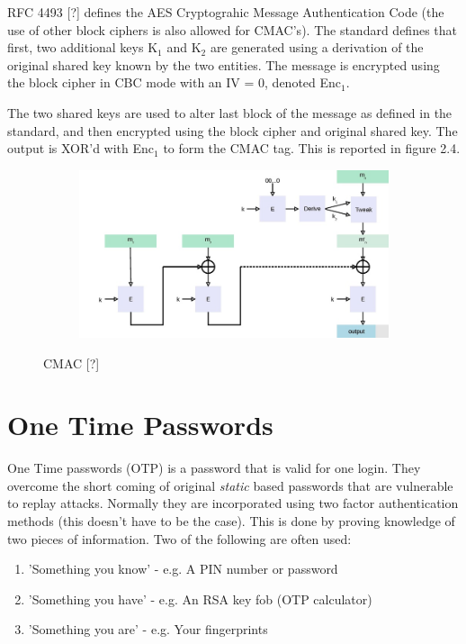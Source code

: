 \documentclass[bsc,frontabs,twoside,singlespacing,parskip,deptreport]{infthesis}     %
\begin{document}
RFC 4493 [?] defines the AES Cryptograhic Message Authentication Code (the use of other block ciphers is also allowed for CMAC's). The standard defines that first, two additional keys K$_1$ and K$_2$ are generated using a derivation of the original shared key known by the two entities. The message is encrypted using the block cipher in CBC mode with an IV = 0, denoted Enc$_1$. 

The two shared keys are used to alter last block of the message as defined in the standard, and then encrypted using the block cipher and original shared key. The output is XOR'd with Enc$_1$ to form the CMAC tag. This is reported in figure 2.4.


\begin{figure}[H]
\centering
\begin{subfigure}{1.2\textwidth}
  \includegraphics[width=1\linewidth]
  {images/crypto/CMAC.jpg}
\end{subfigure}
\caption{CMAC [?]}
\end{figure}


\section{One Time Passwords}
One Time passwords (OTP) is a password that is valid for one login. They overcome the short coming of original \textit{static} based passwords that are vulnerable to replay attacks. Normally they are incorporated using two factor authentication methods (this doesn't have to be the case). This is done by proving knowledge of two pieces of information. Two of the following are often used:
\begin{enumerate}
\item 'Something you know' - e.g. A PIN number or password
\item 'Something you have' - e.g. An RSA key fob (OTP calculator)
\item 'Something you are'  - e.g. Your fingerprints
\end{enumerate}
\end{document}
